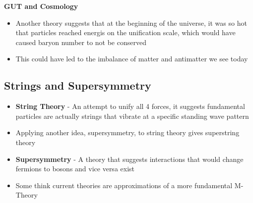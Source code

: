 \textbf{GUT and Cosmology}
\begin{itemize}
    \item Another theory suggests that at the beginning of the universe, it was so hot that particles reached energis on the unification scale, which would have caused baryon number to not be conserved
    \item This could have led to the imbalance of matter and antimatter we see today 
\end{itemize}

\subsection{Strings and Supersymmetry}
\begin{itemize}
    \item \textbf{String Theory} - An attempt to unify all 4 forces, it suggests fundamental particles are actually strings that vibrate at a specific standing wave pattern 
    \item Applying another idea, supersymmetry, to string theory gives superstring theory
    \item \textbf{Supersymmetry} - A theory that suggests interactions that would change fermions to bosons and vice versa exist
    \item Some think current theories are approximations of a more fundamental M-Theory
\end{itemize}

\newpage